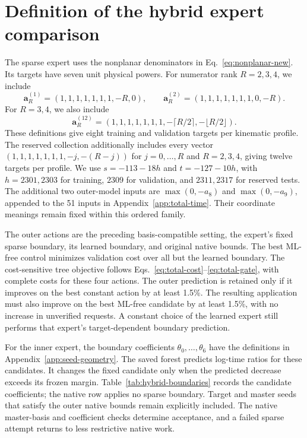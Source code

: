 \section{Definition of the hybrid expert comparison}
\label{app:hybrid-experts}
The sparse expert uses the nonplanar denominators in Eq.~\eqref{eq:nonplanar-new}. Its targets have seven unit physical powers. For numerator rank $R=2,3,4$, we include
\begin{equation}
 \boldsymbol a^{(1)}_R=(1,1,1,1,1,1,1,-R,0),\qquad
 \boldsymbol a^{(2)}_R=(1,1,1,1,1,1,1,0,-R).
\end{equation}
For $R=3,4$, we also include
\begin{equation}
 \boldsymbol a^{(12)}_R=(1,1,1,1,1,1,1,-\lceil R/2\rceil,-\lfloor R/2\rfloor).
\end{equation}
These definitions give eight training and validation targets per kinematic profile. The reserved collection additionally includes every vector $(1,1,1,1,1,1,1,-j,-(R-j))$ for $j=0,\ldots,R$ and $R=2,3,4$, giving twelve targets per profile. We use $s=-113-18h$ and $t=-127-10h$, with $h=2301,2303$ for training, $2309$ for validation, and $2311,2317$ for reserved tests. The additional two outer-model inputs are $\max(0,-a_8)$ and $\max(0,-a_9)$, appended to the 51 inputs in Appendix~\ref{app:total-time}. Their coordinate meanings remain fixed within this ordered family.

The outer actions are the preceding basis-compatible setting, the expert's fixed sparse boundary, its learned boundary, and original native bounds. The best ML-free control minimizes validation cost over all but the learned boundary. The cost-sensitive tree objective follows Eqs.~\eqref{eq:total-cost}--\eqref{eq:total-gate}, with complete costs for these four actions. The outer prediction is retained only if it improves on the best constant action by at least 1.5\%. The resulting application must also improve on the best ML-free candidate by at least 1.5\%, with no increase in unverified requests. A constant choice of the learned expert still performs that expert's target-dependent boundary prediction.

For the inner expert, the boundary coefficients $\theta_0,\ldots,\theta_6$ have the definitions in Appendix~\ref{app:seed-geometry}. The saved forest predicts log-time ratios for these candidates. It changes the fixed candidate only when the predicted decrease exceeds its frozen margin. Table~\ref{tab:hybrid-boundaries} records the candidate coefficients; the native row applies no sparse boundary. Target and master seeds that satisfy the outer native bounds remain explicitly included. The native master-basis and coefficient checks determine acceptance, and a failed sparse attempt returns to less restrictive native work.

